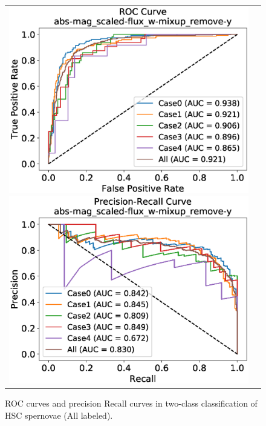 \documentclass[useamsfonts]{pasj01}
\begin{document}
%
%
%
\begin{figure}[h]
    \begin{tabular}{cc}
        \begin{minipage}{0.5\hsize}
            \begin{center}
                \includegraphics[width=\columnwidth]{figures/10_abs-mag_scaled-flux_w-mixup_remove-y_predictions_test_ROC_all.eps}
            \end{center}
        \end{minipage}
        \begin{minipage}{0.5\hsize}
            \begin{center}
                \includegraphics[width=\columnwidth]{figures/10_abs-mag_scaled-flux_w-mixup_remove-y_predictions_test_PreRec_all.eps}
            \end{center}
        \end{minipage}
    \end{tabular}
    \caption{%
    ROC curves and precision Recall curves in two-class classification of HSC spernovae (All labeled).
    }
    \label{fig:h2_test_all}
\end{figure}
\end{document}
